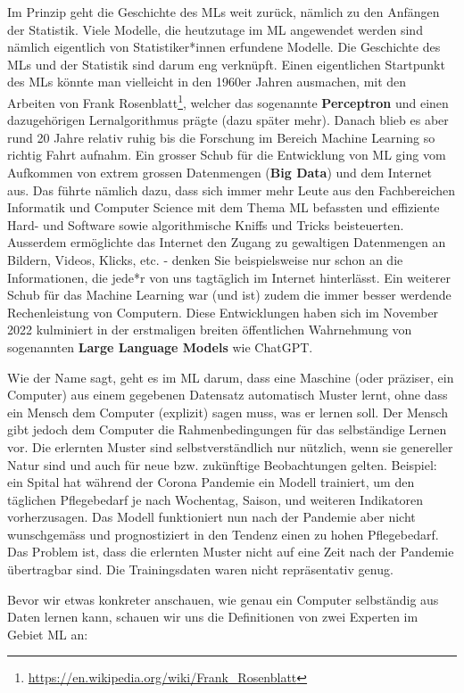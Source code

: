 \documentclass[
]{book}
\begin{document}
Im Prinzip geht die Geschichte des MLs weit zurück, nämlich zu den Anfängen der Statistik. Viele Modelle, die heutzutage im ML angewendet werden sind nämlich eigentlich von Statistiker*innen erfundene Modelle. Die Geschichte des MLs und der Statistik sind darum eng verknüpft. Einen eigentlichen Startpunkt des MLs könnte man vielleicht in den 1960er Jahren ausmachen, mit den Arbeiten von Frank Rosenblatt\footnote{\url{https://en.wikipedia.org/wiki/Frank_Rosenblatt}}, welcher das sogenannte \textbf{Perceptron} und einen dazugehörigen Lernalgorithmus prägte (dazu später mehr). Danach blieb es aber rund 20 Jahre relativ ruhig bis die Forschung im Bereich Machine Learning so richtig Fahrt aufnahm. Ein grosser Schub für die Entwicklung von ML ging vom Aufkommen von extrem grossen Datenmengen (\textbf{Big Data}) und dem Internet aus. Das führte nämlich dazu, dass sich immer mehr Leute aus den Fachbereichen Informatik und Computer Science mit dem Thema ML befassten und effiziente Hard- und Software sowie algorithmische Kniffs und Tricks beisteuerten. Ausserdem ermöglichte das Internet den Zugang zu gewaltigen Datenmengen an Bildern, Videos, Klicks, etc. - denken Sie beispielsweise nur schon an die Informationen, die jede*r von uns tagtäglich im Internet hinterlässt. Ein weiterer Schub für das Machine Learning war (und ist) zudem die immer besser werdende Rechenleistung von Computern. Diese Entwicklungen haben sich im November 2022 kulminiert in der erstmaligen breiten öffentlichen Wahrnehmung von sogenannten \textbf{Large Language Models} wie ChatGPT.

Wie der Name sagt, geht es im ML darum, dass eine Maschine (oder präziser, ein Computer) aus einem gegebenen Datensatz automatisch Muster lernt, ohne dass ein Mensch dem Computer (explizit) sagen muss, was er lernen soll. Der Mensch gibt jedoch dem Computer die Rahmenbedingungen für das selbständige Lernen vor. Die erlernten Muster sind selbstverständlich nur nützlich, wenn sie genereller Natur sind und auch für neue bzw. zukünftige Beobachtungen gelten. Beispiel: ein Spital hat während der Corona Pandemie ein Modell trainiert, um den täglichen Pflegebedarf je nach Wochentag, Saison, und weiteren Indikatoren vorherzusagen. Das Modell funktioniert nun nach der Pandemie aber nicht wunschgemäss und prognostiziert in den Tendenz einen zu hohen Pflegebedarf. Das Problem ist, dass die erlernten Muster nicht auf eine Zeit nach der Pandemie übertragbar sind. Die Trainingsdaten waren nicht repräsentativ genug.

Bevor wir etwas konkreter anschauen, wie genau ein Computer selbständig aus Daten lernen kann, schauen wir uns die Definitionen von zwei Experten im Gebiet ML an:
\end{document}
